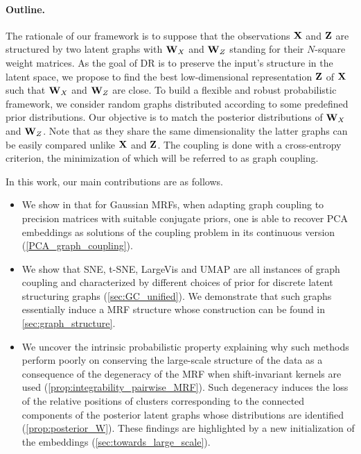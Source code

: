 \paragraph{Outline.} 
The rationale of our framework is to suppose that the observations $\mathbf{X}$ and $\mathbf{Z}$ are structured by two latent graphs with $\mathbf{W}_{X}$ and $\mathbf{W}_{Z}$ standing for their $N$-square weight matrices.
As the goal of DR is to preserve the input's structure in the latent space, we propose to find the best low-dimensional representation $\mathbf{Z}$ of $\mathbf{X}$ such that $\mathbf{W}_{X}$ and $\mathbf{W}_{Z}$ are close. To build a flexible and robust probabilistic framework, we consider random graphs distributed according to some predefined prior distributions. Our objective is to match the posterior distributions of $\mathbf{W}_{X}$ and $\mathbf{W}_{Z}$. Note that as they share the same dimensionality the latter graphs can be easily compared unlike $\mathbf{X}$ and $\mathbf{Z}$. The coupling is done with a cross-entropy criterion, the minimization of which will be referred to as graph coupling.

In this work, our main contributions are as follows.

\begin{itemize}
    \item We show in  that for Gaussian MRFs, when adapting graph coupling to precision matrices with suitable conjugate priors, one is able to recover PCA embeddings as solutions of the coupling problem in its continuous version (\cref{PCA_graph_coupling}).
    \item We show that SNE, t-SNE, LargeVis and UMAP are all instances of graph coupling and characterized by different choices of prior for discrete latent structuring graphs (\cref{sec:GC_unified}). We demonstrate that such graphs essentially induce a MRF structure whose construction can be found in \cref{sec:graph_structure}.
    \item We uncover the intrinsic probabilistic property explaining why such methods perform poorly on conserving the large-scale structure of the data as a consequence of the degeneracy of the MRF when shift-invariant kernels are used (\cref{prop:integrability_pairwise_MRF}). Such degeneracy induces the loss of the relative positions of clusters corresponding to the connected components of the posterior latent graphs whose distributions are identified (\cref{prop:posterior_W}). These findings are highlighted by a new initialization of the embeddings (\cref{sec:towards_large_scale}).
\end{itemize}
